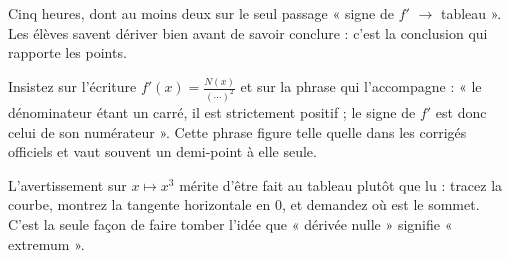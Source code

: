 \begin{notepourlaclasse}
Cinq heures, dont au moins deux sur le seul passage « signe de $f'$
$\rightarrow$ tableau ». Les élèves savent dériver bien avant de savoir
conclure : c'est la conclusion qui rapporte les points.

Insistez sur l'écriture $f'(x) = \frac{N(x)}{(\cdots)^{2}}$ et sur la phrase
qui l'accompagne : « le dénominateur étant un carré, il est strictement
positif ; le signe de $f'$ est donc celui de son numérateur ». Cette phrase
figure telle quelle dans les corrigés officiels et vaut souvent un demi-point
à elle seule.

L'avertissement sur $x \mapsto x^{3}$ mérite d'être fait au tableau plutôt
que lu : tracez la courbe, montrez la tangente horizontale en $0$, et
demandez où est le sommet. C'est la seule façon de faire tomber l'idée que
« dérivée nulle » signifie « extremum ».
\end{notepourlaclasse}
